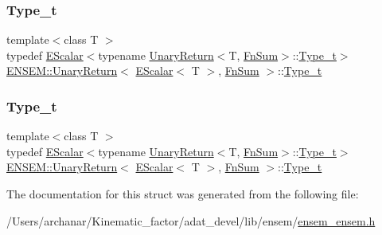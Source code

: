 \subsubsection{\texorpdfstring{Type\_t}{Type\_t}\hspace{0.1cm}{\footnotesize\ttfamily [1/2]}}
{\footnotesize\ttfamily template$<$class T $>$ \\
typedef \mbox{\hyperlink{classENSEM_1_1EScalar}{E\+Scalar}}$<$typename \mbox{\hyperlink{structENSEM_1_1UnaryReturn}{Unary\+Return}}$<$T, \mbox{\hyperlink{structENSEM_1_1FnSum}{Fn\+Sum}}$>$\+::\mbox{\hyperlink{structENSEM_1_1UnaryReturn_3_01EScalar_3_01T_01_4_00_01FnSum_01_4_af4e59c889efbb46ce21a3b03bb7c9b9e}{Type\+\_\+t}}$>$ \mbox{\hyperlink{structENSEM_1_1UnaryReturn}{E\+N\+S\+E\+M\+::\+Unary\+Return}}$<$ \mbox{\hyperlink{classENSEM_1_1EScalar}{E\+Scalar}}$<$ T $>$, \mbox{\hyperlink{structENSEM_1_1FnSum}{Fn\+Sum}} $>$\+::\mbox{\hyperlink{structENSEM_1_1UnaryReturn_3_01EScalar_3_01T_01_4_00_01FnSum_01_4_af4e59c889efbb46ce21a3b03bb7c9b9e}{Type\+\_\+t}}}

\mbox{\label{structENSEM_1_1UnaryReturn_3_01EScalar_3_01T_01_4_00_01FnSum_01_4_af4e59c889efbb46ce21a3b03bb7c9b9e}} 
\subsubsection{\texorpdfstring{Type\_t}{Type\_t}\hspace{0.1cm}{\footnotesize\ttfamily [2/2]}}
{\footnotesize\ttfamily template$<$class T $>$ \\
typedef \mbox{\hyperlink{classENSEM_1_1EScalar}{E\+Scalar}}$<$typename \mbox{\hyperlink{structENSEM_1_1UnaryReturn}{Unary\+Return}}$<$T, \mbox{\hyperlink{structENSEM_1_1FnSum}{Fn\+Sum}}$>$\+::\mbox{\hyperlink{structENSEM_1_1UnaryReturn_3_01EScalar_3_01T_01_4_00_01FnSum_01_4_af4e59c889efbb46ce21a3b03bb7c9b9e}{Type\+\_\+t}}$>$ \mbox{\hyperlink{structENSEM_1_1UnaryReturn}{E\+N\+S\+E\+M\+::\+Unary\+Return}}$<$ \mbox{\hyperlink{classENSEM_1_1EScalar}{E\+Scalar}}$<$ T $>$, \mbox{\hyperlink{structENSEM_1_1FnSum}{Fn\+Sum}} $>$\+::\mbox{\hyperlink{structENSEM_1_1UnaryReturn_3_01EScalar_3_01T_01_4_00_01FnSum_01_4_af4e59c889efbb46ce21a3b03bb7c9b9e}{Type\+\_\+t}}}



The documentation for this struct was generated from the following file\+:\begin{DoxyCompactItemize}
\item 
/\+Users/archanar/\+Kinematic\+\_\+factor/adat\+\_\+devel/lib/ensem/\mbox{\hyperlink{lib_2ensem_2ensem__ensem_8h}{ensem\+\_\+ensem.\+h}}\end{DoxyCompactItemize}
